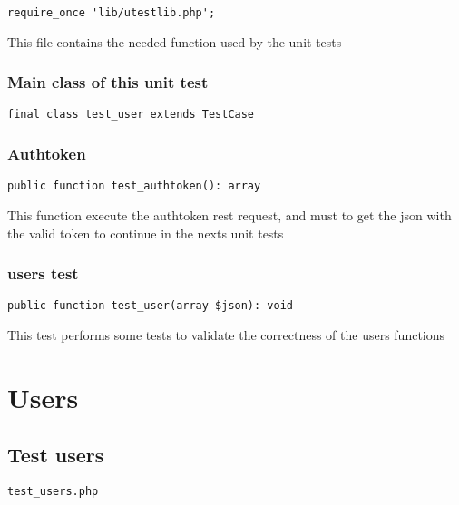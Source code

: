 \documentclass[a4paper]{article}
\begin{document}
\begin{lstlisting}
require_once 'lib/utestlib.php';
\end{lstlisting}

This file contains the needed function used by the unit tests

\hypertarget{toc408}{}
\subsubsection{Main class of this unit test}

\begin{lstlisting}
final class test_user extends TestCase
\end{lstlisting}

\hypertarget{toc409}{}
\subsubsection{Authtoken}

\begin{lstlisting}
public function test_authtoken(): array
\end{lstlisting}

This function execute the authtoken rest request, and must to get the
json with the valid token to continue in the nexts unit tests

\hypertarget{toc410}{}
\subsubsection{users test}

\begin{lstlisting}
public function test_user(array $json): void
\end{lstlisting}

This test performs some tests to validate the correctness
of the users functions


\hypertarget{toc411}{}
\section{Users}

\hypertarget{toc412}{}
\subsection{Test users}

\begin{lstlisting}
test_users.php
\end{lstlisting}
\end{document}
